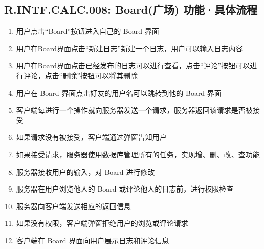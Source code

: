     \subsection{R.INTF.CALC.008: Board(广场) 功能·具体流程}
    \begin{enumerate}
        \item 用户点击“Board”按钮进入自己的 Board 界面
        \item 用户在Board界面点击“新建日志”新建一个日志，用户可以输入日志内容
        \item 用户在Board界面点击已经发布的日志可以进行查看，点击“评论”按钮可以进行评论，点击“删除”按钮可以将其删除
        \item 用户在 Board 界面点击好友的用户名可以跳转到他的 Board 界面
        \item 客户端每进行一个操作就向服务器发送一个请求，服务器返回该请求是否被接受
        \item 如果请求没有被接受，客户端通过弹窗告知用户
        \item 如果接受请求，服务器使用数据库管理所有的任务，实现增、删、改、查功能
        \item 服务器接收用户的输入，对 Board 进行修改
        \item 服务器在用户浏览他人的 Board 或评论他人的日志前，进行权限检查
        \item 服务器向客户端发送相应的返回信息
        \item 如果没有权限，客户端弹窗拒绝用户的浏览或评论请求
        \item 客户端在 Board 界面向用户展示日志和评论信息
    \end{enumerate}
    
